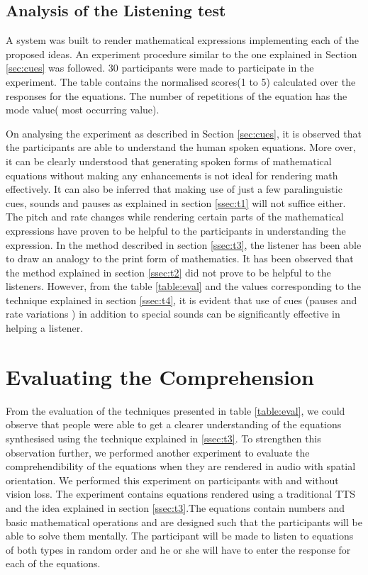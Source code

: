 \documentclass{article}
\begin{document}
\subsection{Analysis of the Listening test}
\label{ssec:ideaseval}


A system was built to render mathematical expressions implementing each of the proposed ideas. An experiment procedure similar to the one explained in Section \ref{sec:cues} was followed. 30 participants were made to participate in the experiment. The table contains the normalised scores(1 to 5) calculated over the responses for the equations. The number of repetitions of the equation has the  mode value( most occurring value).

On analysing the experiment as described in Section \ref{sec:cues}, it is observed that the participants are able to understand the human spoken equations. More over, it can be clearly understood that generating spoken forms of mathematical equations without making any enhancements is not ideal for rendering math effectively. It can also be inferred that making use of just  a few paralinguistic cues, sounds and pauses as explained in section \ref{ssec:t1} will not suffice either. The pitch and rate changes while rendering certain parts of the mathematical expressions have proven to be helpful to the participants in understanding the expression. In the method described in section \ref{ssec:t3}, the listener has been able to draw an analogy to the print form of mathematics. It has been observed that the method explained in section \ref{ssec:t2} did not prove to be helpful to the listeners. However, from the table \ref{table:eval} and the values corresponding to the technique explained in section \ref{ssec:t4}, it is evident that use of  cues (pauses and rate variations ) in addition to special sounds can be significantly effective in helping a listener.



\section{Evaluating the Comprehension}
\label{sec:comprehension}
 From the evaluation of the techniques presented in table \ref{table:eval}, we could observe that people were able to get a clearer understanding of the equations synthesised using the technique explained in \ref{ssec:t3}. To strengthen this observation further, we performed another experiment to evaluate the comprehendibility of the equations when they are rendered in audio with spatial orientation. We performed this experiment on participants with and without vision loss. The experiment contains equations rendered using a traditional TTS and the idea explained in section \ref{ssec:t3}.The equations contain numbers and basic mathematical operations and are designed such that the participants will be able to solve them mentally. The participant will be made to listen to equations of both  types in random order and he or she will have to enter the response for each of the equations.
\end{document}
